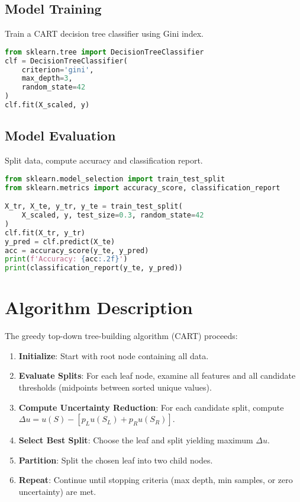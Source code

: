 \documentclass[11pt]{article}
\begin{document}
\subsection{Model Training}
Train a CART decision tree classifier using Gini index.
\begin{lstlisting}[language=Python]
from sklearn.tree import DecisionTreeClassifier
clf = DecisionTreeClassifier(
    criterion='gini',
    max_depth=3,
    random_state=42
)
clf.fit(X_scaled, y)
\end{lstlisting}

\subsection{Model Evaluation}
Split data, compute accuracy and classification report.
\begin{lstlisting}[language=Python]
from sklearn.model_selection import train_test_split
from sklearn.metrics import accuracy_score, classification_report

X_tr, X_te, y_tr, y_te = train_test_split(
    X_scaled, y, test_size=0.3, random_state=42
)
clf.fit(X_tr, y_tr)
y_pred = clf.predict(X_te)
acc = accuracy_score(y_te, y_pred)
print(f'Accuracy: {acc:.2f}')
print(classification_report(y_te, y_pred))
\end{lstlisting}

\section{Algorithm Description}
The greedy top-down tree-building algorithm (CART) proceeds:
\begin{enumerate}
  \item \textbf{Initialize}: Start with root node containing all data.
  \item \textbf{Evaluate Splits}: For each leaf node, examine all features and all candidate thresholds (midpoints between sorted unique values).
  \item \textbf{Compute Uncertainty Reduction}: For each candidate split, compute $\Delta u = u(S) - [p_L u(S_L) + p_R u(S_R)]$.
  \item \textbf{Select Best Split}: Choose the leaf and split yielding maximum $\Delta u$.
  \item \textbf{Partition}: Split the chosen leaf into two child nodes.
  \item \textbf{Repeat}: Continue until stopping criteria (max depth, min samples, or zero uncertainty) are met.
\end{enumerate}
\end{document}
